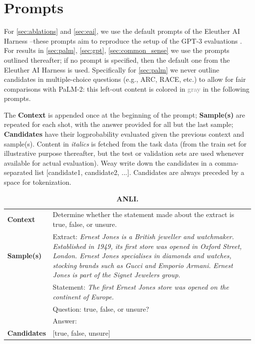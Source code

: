 \documentclass{article}
\begin{document}
\section{Prompts}
\label{sec:ohmyprompt}

For \cref{sec:ablations} and \cref{sec:eai}, we use the default prompts of the Eleuther AI Harness \citep{eval-harness}--these prompts aim to reproduce the setup of the GPT-3 evaluations \citep{brown2020gpt3}. For results in \cref{sec:palm}, \cref{sec:gpt}, \cref{sec:common_sense} we use the prompts outlined thereafter; if no prompt is specified, then the default one from the Eleuther AI Harness is used. Specifically for \cref{sec:palm} we never outline candidates in multiple-choice questions (e.g., ARC, RACE, etc.) to allow for fair comparisons with PaLM-2: this left-out content is colored in \textcolor{gray}{gray} in the following prompts. 

The \textbf{Context} is appended once at the beginning of the prompt; \textbf{Sample(s)} are repeated for each shot, with the answer provided for all but the last sample; \textbf{Candidates} have their logprobability evaluated given the previous context and sample(s). Content in \emph{italics} is fetched from the task data (from the train set for illustrative purpose thereafter, but the test or validation sets are used whenever available for actual evaluation). Weay write down the candidates in a comma-separated list {[}candidate1, candidate2, ...{]}. Candidates are always preceded by a space for tokenization. 

\begin{table}[h]
\caption{\textbf{ANLI.}}
\begin{tabular}{lp{11.5cm}}
\toprule
\textbf{Context}   & Determine whether the statement made about the extract is true, false, or unsure.                                                                                                            \\
\textbf{Sample(s)} & Extract: \emph{Ernest Jones is a British jeweller and watchmaker. Established in 1949, its first store was opened in Oxford Street, London. Ernest Jones specialises in diamonds and watches, stocking brands such as Gucci and Emporio Armani. Ernest Jones is part of the Signet Jewelers group.} \\
& Statement: \emph{The first Ernest Jones store was opened on the continent of Europe.} \\
& Question: true, false, or unsure? \\
& Answer:\\
\textbf{Candidates}   & {[}true, false, unsure{]}       \\                                                 \bottomrule                                                                                                         
\end{tabular}
\end{table}
\end{document}
